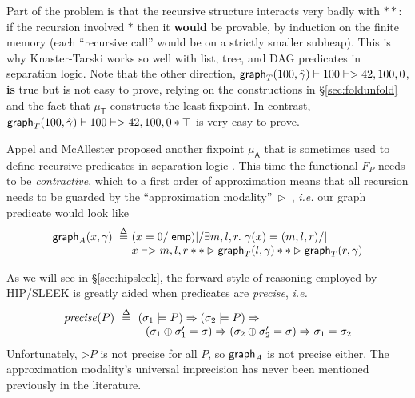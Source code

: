 Part of the problem is that the recursive structure interacts very badly with $**$: if the recursion involved $*$ then it \textbf{would} be provable, by induction on the finite memory (each ``recursive call'' would be on a strictly smaller subheap).  This is why Knaster-Tarski works so well with list, tree, and DAG predicates in separation logic.  Note that the other direction, \mbox{$\mathsf{graph}_T(100,\hat{\gamma}) |- 100 |-> 42,100,0$},
\textbf{is} true but is not easy to prove, relying on the constructions in \S\ref{sec:foldunfold} and the fact that $\mu_{\mathsf{T}}$ constructs the least fixpoint.  In contrast, $\mathsf{graph}_T(100,\hat{\gamma}) |- 100 |-> 42,100,0 * \top$ is very easy to prove. %





Appel and McAllester proposed another fixpoint $\mu_{\mathsf{A}}$
that is sometimes used to define recursive predicates in separation 
logic \cite{appel:fixpoint}.  This time the functional $F_P$ needs to be
\emph{contractive}, which to a first order of approximation means that
all recursion needs to be guarded by the ``approximation
modality''~$\rhd$~\cite{appel:vmm}, \emph{i.e.} our graph predicate would
look like 
\[
\begin{array}{@{}l@{}l@{}}
\grapham(x, \gamma) ~ \stackrel{\Delta}{=} ~ & (x = 0 /| \p{emp}) |/ \exists m,l,r.~ \gamma(x)=(m,l,r) /| \null \\
& x |-> m,l,r ** \rhd \graphkt(l, \gamma) ** \rhd \graphkt(r, \gamma)
\end{array}
\]

As we will see in \S\ref{sec:hipsleek}, the forward style of reasoning employed by
HIP/SLEEK is greatly aided when predicates are \emph{precise}, \emph{i.e.}
\[
\begin{array}{@{}l@{}l@{}}
\m{precise}(P) ~~ \defeq ~~ & (\sigma_1 |= P) => (\sigma_2 |= P) => \\
& ~~ (\sigma_1 \oplus \sigma_1' = \sigma) => (\sigma_2 \oplus \sigma_2' = \sigma) => \sigma_1 = \sigma_2
\end{array}
\]
Unfortunately, $\rhd P$ is not precise for all $P$, so $\mathsf{graph}_A$ is not precise either.  The approximation modality's universal imprecision has never been mentioned previously in the literature.  %

